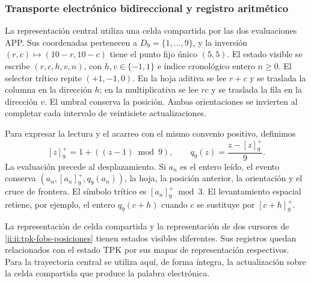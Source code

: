 \subsubsection{Transporte electrónico bidireccional y registro aritmético}
\label{ii:ii:transporte-electronico}

La representación central utiliza una celda compartida por las dos
evaluaciones APP. Sus coordenadas pertenecen a \(D_9=\{1,\ldots,9\}\),
y la inversión \((r,c)\mapsto(10-r,10-c)\) tiene el punto fijo único
\((5,5)\). El estado visible se escribe \((r,c,h,v,n)\), con
\(h,v\in\{-1,1\}\) e índice cronológico entero \(n\geq0\).
El selector trítico repite \((+1,-1,0)\). En la hoja aditiva se lee
\(r+c\) y se traslada la columna en la dirección \(h\); en la
multiplicativa se lee \(rc\) y se traslada la fila en la dirección
\(v\). El umbral conserva la posición. Ambas orientaciones se
invierten al completar cada intervalo de veintisiete actualizaciones.

Para expresar la lectura y el acarreo con el mismo convenio positivo,
definimos
\[
 [z]^+_9=1+((z-1)\bmod9),\qquad
 q_9(z)=\frac{z-[z]^+_9}{9}.
\]
La evaluación precede al desplazamiento. Si \(a_n\) es el entero
leído, el evento conserva \((a_n,[a_n]^+_9,q_9(a_n))\), la hoja,
la posición anterior, la orientación y el cruce de frontera. El
símbolo trítico es \([a_n]^+_9\bmod3\). El levantamiento espacial
retiene, por ejemplo, el entero
\(q_9(c+h)\) cuando \(c\) se sustituye por \([c+h]^+_9\).

La representación de celda compartida y la representación de dos
cursores de \eqref{ii:ii:tpk-fobs-posiciones} tienen estados visibles
diferentes. Sus registros quedan relacionados con el estado TPK por
sus mapas de representación respectivos. Para la trayectoria central
se utiliza aquí, de forma íntegra, la actualización sobre la celda
compartida que produce la palabra electrónica.

